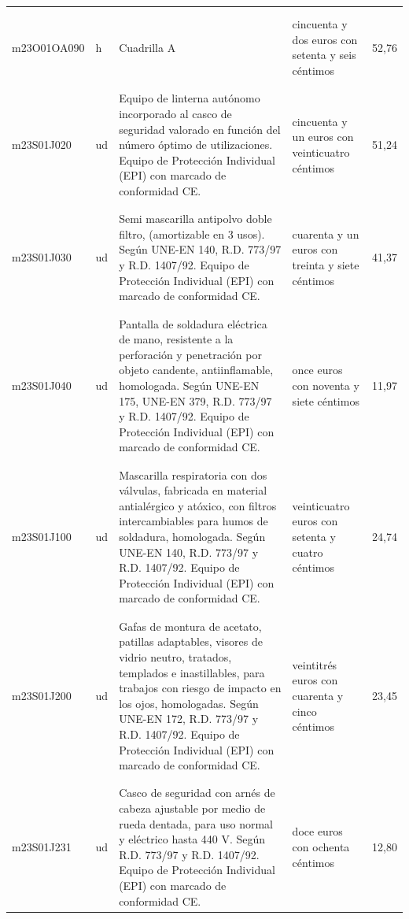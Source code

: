 \documentclass{book}%
\begin{document}
\begin{supertabular}{|l|l|p{5cm}|p{3cm}|r|}
&&&&\\%
&&&&\\%
m23O01OA090&h&Cuadrilla A&cincuenta y dos euros con setenta y seis céntimos&52,76\\%
&&&&\\%
&&&&\\%
m23S01J020&ud&Equipo de linterna autónomo incorporado al casco de seguridad valorado en función del número óptimo de utilizaciones. Equipo de Protección Individual (EPI) con marcado de conformidad CE.&cincuenta y un euros con veinticuatro céntimos&51,24\\%
&&&&\\%
&&&&\\%
m23S01J030&ud&Semi mascarilla antipolvo doble filtro, (amortizable en 3 usos). Según UNE{-}EN 140, R.D. 773/97 y R.D. 1407/92. Equipo de Protección Individual (EPI) con marcado de conformidad CE.&cuarenta y un euros con treinta y siete céntimos&41,37\\%
&&&&\\%
&&&&\\%
m23S01J040&ud&Pantalla de soldadura eléctrica de mano, resistente a la perforación y penetración por objeto candente, antiinflamable, homologada. Según UNE{-}EN 175, UNE{-}EN 379, R.D. 773/97 y R.D. 1407/92. Equipo de Protección Individual (EPI) con marcado de conformidad CE.&once euros con noventa y siete céntimos&11,97\\%
&&&&\\%
&&&&\\%
m23S01J100&ud&Mascarilla respiratoria con dos válvulas, fabricada en material antialérgico y atóxico, con filtros intercambiables para humos de soldadura, homologada. Según UNE{-}EN 140, R.D. 773/97 y R.D. 1407/92. Equipo de Protección Individual (EPI) con marcado de conformidad CE.&veinticuatro euros con setenta y cuatro céntimos&24,74\\%
&&&&\\%
&&&&\\%
m23S01J200&ud&Gafas de montura de acetato, patillas adaptables, visores de vidrio neutro, tratados, templados e inastillables, para trabajos con riesgo de impacto en los ojos, homologadas. Según UNE{-}EN 172, R.D. 773/97 y R.D. 1407/92. Equipo de Protección Individual (EPI) con marcado de conformidad CE.&veintitrés euros con cuarenta y cinco céntimos&23,45\\%
&&&&\\%
&&&&\\%
m23S01J231&ud&Casco de seguridad con arnés de cabeza ajustable por medio de rueda dentada, para uso normal y eléctrico hasta 440 V. Según R.D. 773/97 y R.D. 1407/92. Equipo de Protección Individual (EPI) con marcado de conformidad CE.&doce euros con ochenta céntimos&12,80\\%

\end{supertabular}
\end{document}

